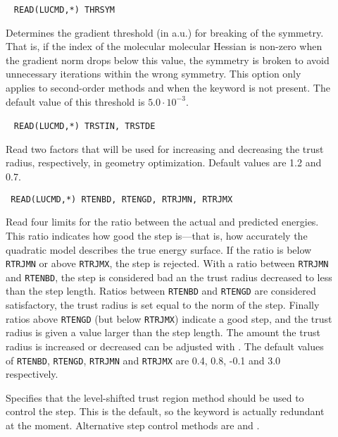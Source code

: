 \begin{description}
\item[]\verb| | \newline
\verb|READ(LUCMD,*) THRSYM|

Determines the gradient threshold (in a.u.) for breaking of the
symmetry. That is, if the index of the
molecular molecular Hessian is non-zero when the gradient norm
drops below this value, the symmetry is broken to avoid unnecessary
iterations within the wrong symmetry. This option only applies to
second-order methods and when the
keyword  is not present. The default value of this
threshold is $5.0\cdot 10^{-3}$.

\item[]\verb| | \newline
\verb|READ(LUCMD,*) TRSTIN, TRSTDE|

Read two factors that will be used for increasing and decreasing the
trust radius, respectively, in geometry optimization. Default values are
1.2 and 0.7.

\item[]\verb| | \newline
\verb|READ(LUCMD,*) RTENBD, RTENGD, RTRJMN, RTRJMX|

Read four limits for the ratio between the actual and predicted
energies. This ratio indicates how good the step is---that is, how
accurately the quadratic model describes the true energy
surface. If the ratio is below \verb|RTRJMN| or above
\verb|RTRJMX|, the step is rejected. With a ratio between
\verb|RTRJMN| and \verb|RTENBD|, the step is considered bad an the
trust radius decreased to less than the step
length. Ratios between \verb|RTENBD| and \verb|RTENGD| are
considered satisfactory, the trust radius is set equal to the norm
of the step. Finally ratios above \verb|RTENGD| (but below
\verb|RTRJMX|) indicate a good step, and the trust radius is given
a value larger than the step length. The amount the trust radius
is increased or decreased can be adjusted with . The
default values of \verb|RTENBD|, \verb|RTENGD|, \verb|RTRJMN| and
\verb|RTRJMX| are 0.4, 0.8, -0.1 and 3.0 respectively.

\item[]
Specifies that the level-shifted trust region method should be used to
control the step. This is the default, so the keyword is actually
redundant at the moment. Alternative step control methods are 
and .


\end{description}
